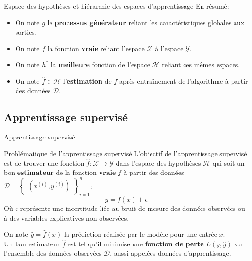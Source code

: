 \begin{frame}{Espace des hypothèses et hiérarchie des espaces d'apprentissage}
	En résumé:
	\begin{itemize}
		\item On note $g$ le \textbf{processus générateur} reliant les caractéristiques globales aux sorties.
		\item On note $f$ la fonction \textbf{vraie} reliant l'espace $\mathcal{X}$ à l'espace $\mathcal{Y}$.
		\item On note $h^*$ la \textbf{meilleure} fonction de l'espace $\mathcal{H}$ reliant ces mêmes espaces.
		\item On note $\hat{f} \in \mathcal{H}$ l'\textbf{estimation} de $f$ après entraînement de l'algorithme à partir des données $\mathcal{D}$.
	\end{itemize}
\end{frame}

\subsection[Apprentissage supervisé]{Apprentissage supervisé}

\begin{frame}{Apprentissage supervisé}
	\begin{block}{Problématique de l'apprentissage supervisé}
		L'objectif de l'apprentissage supervisé est de trouver une fonction $\hat{f}: \mathcal{X} \to \mathcal{Y}$ dans l'espace des hypothèses $\mathcal{H}$ qui soit un bon \textbf{estimateur} de la fonction \textbf{vraie} $f$ à partir des données $\mathcal{D} = \begin{Bmatrix}(x^{(i)}, y^{(i)})\end{Bmatrix}_{i=1}^n$:
		\begin{equation}
			y = f(x) + \epsilon
			\nonumber
		\end{equation}
		Où $\epsilon$ représente une incertitude liée au bruit de mesure des données observées ou à des variables explicatives non-observées.
		\hfill
	\end{block}
	\vspace{0.5cm}
	\pause
	On note $\hat{y} = \hat{f}(x)$ la prédiction réalisée par le modèle pour une entrée $x$. \\
	\vspace{0.5cm}
	\pause
	Un bon estimateur $\hat{f}$ est tel qu'il minimise une \textbf{fonction de perte} $L(y, \hat{y})$ sur l'ensemble des données observées $\mathcal{D}$, aussi appelées données d'apprentissage.
\end{frame}

